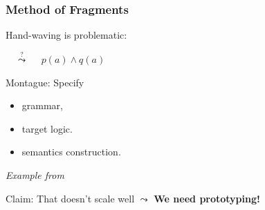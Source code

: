 

\begin{frame}
    \frametitle{Method of Fragments}
    {\color{hlfont}Hand-waving} is problematic:

    \hspace{2em}
    {$\quad\stackrel{?}{\leadsto}\quad$ \color{logicfont} $p(a)\wedge q(a)$}

    \vspace{1.2em}
    {\color{hlfont}Montague}: Specify
    \begin{itemize}
        \item grammar,
        \item target logic.
        \item semantics construction.
    \end{itemize}

    {
        \centering
        \vspace{0.3em}
        {\itshape\footnotesize Example from~\cite{Montague:tptoqi73}}

        \vspace{0.2em}

        \vspace{1.2em}
        Claim: That doesn't scale well $\leadsto$ \textbf{We need {\color{hlfont}prototyping}!}
    }

\end{frame}

